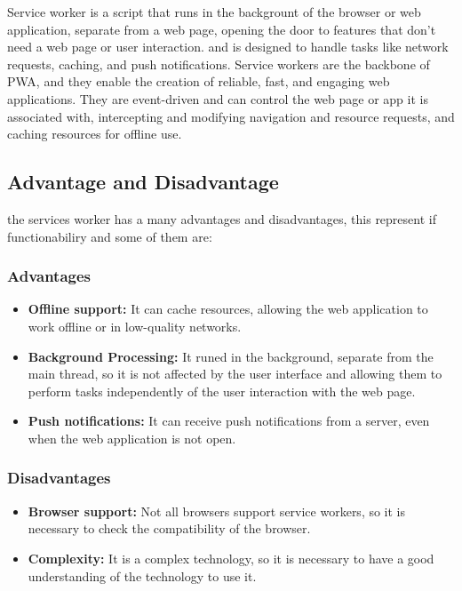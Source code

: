 \documentclass[12pt,a4paper, twosite]{article}
\begin{document}
Service worker is a script that runs in the backgrount of the browser or web application, separate from a web page, opening the door to features that don't need a web page or user interaction. and is designed to handle tasks like network requests, caching, and push notifications. Service workers are the backbone of PWA, and they enable the creation of reliable, fast, and engaging web applications. They are event-driven and can control the web page or app it is associated with, intercepting and modifying navigation and resource requests, and caching resources for offline use.

\subsection{Advantage and Disadvantage}
\label{sec:orgf3e3e4e}
the services worker has a many advantages and disadvantages, this represent if functionabiliry and some of them are:

\subsubsection{Advantages}
\label{sec:orgf3e3e5e}
\begin{itemize}
  \item \textbf{Offline support:} It can cache resources, allowing the web application to work offline or in low-quality networks.
  \item \textbf{Background Processing:} It runed in the background, separate from the main thread, so it is not affected by the user interface and allowing them to perform tasks independently of the user interaction with the web page.
  \item \textbf{Push notifications:} It can receive push notifications from a server, even when the web application is not open.
\end{itemize}

\subsubsection{Disadvantages}
\label{sec:orgf3e3e6e}
\begin{itemize}
  \item \textbf{Browser support:} Not all browsers support service workers, so it is necessary to check the compatibility of the browser.
  \item \textbf{Complexity:} It is a complex technology, so it is necessary to have a good understanding of the technology to use it.
\end{itemize}
\end{document}
